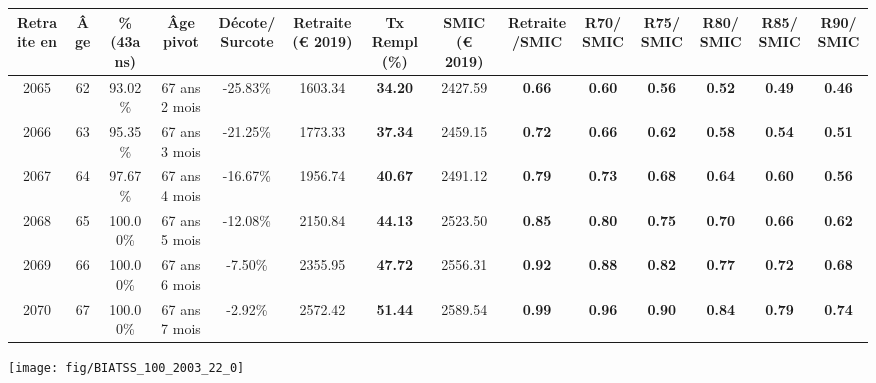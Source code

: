 \begin{adjustbox}{max width=\textwidth} 
\begin{tabular}[htb]{|c|c||c|c|c||c|c||c|c||c|c|c|c|c|} 
\hline 
 Retraite en &  Âge &  \%(43ans) &  Âge pivot &  Décote/Surcote &  Retraite (\euro{} 2019) &  Tx Rempl(\%) &  SMIC (\euro{} 2019) &  Retraite/SMIC &  R70/SMIC &  R75/SMIC &  R80/SMIC &  R85/SMIC &  R90/SMIC \\ 
\hline \hline 
 2065 &  62 &  93.02\% &  67 ans 2 mois &  -25.83\% &  1603.34 &  {\bf 34.20} &  2427.59 &  {\bf {\color{red} 0.66}} &  {\bf {\color{red} 0.60}} &  {\bf {\color{red} 0.56}} &  {\bf {\color{red} 0.52}} &  {\bf {\color{red} 0.49}} &  {\bf {\color{red} 0.46}} \\ 
\hline 
 2066 &  63 &  95.35\% &  67 ans 3 mois &  -21.25\% &  1773.33 &  {\bf 37.34} &  2459.15 &  {\bf {\color{red} 0.72}} &  {\bf {\color{red} 0.66}} &  {\bf {\color{red} 0.62}} &  {\bf {\color{red} 0.58}} &  {\bf {\color{red} 0.54}} &  {\bf {\color{red} 0.51}} \\ 
\hline 
 2067 &  64 &  97.67\% &  67 ans 4 mois &  -16.67\% &  1956.74 &  {\bf 40.67} &  2491.12 &  {\bf {\color{red} 0.79}} &  {\bf {\color{red} 0.73}} &  {\bf {\color{red} 0.68}} &  {\bf {\color{red} 0.64}} &  {\bf {\color{red} 0.60}} &  {\bf {\color{red} 0.56}} \\ 
\hline 
 2068 &  65 &  100.00\% &  67 ans 5 mois &  -12.08\% &  2150.84 &  {\bf 44.13} &  2523.50 &  {\bf {\color{red} 0.85}} &  {\bf {\color{red} 0.80}} &  {\bf {\color{red} 0.75}} &  {\bf {\color{red} 0.70}} &  {\bf {\color{red} 0.66}} &  {\bf {\color{red} 0.62}} \\ 
\hline 
 2069 &  66 &  100.00\% &  67 ans 6 mois &  -7.50\% &  2355.95 &  {\bf 47.72} &  2556.31 &  {\bf {\color{red} 0.92}} &  {\bf {\color{red} 0.88}} &  {\bf {\color{red} 0.82}} &  {\bf {\color{red} 0.77}} &  {\bf {\color{red} 0.72}} &  {\bf {\color{red} 0.68}} \\ 
\hline 
 2070 &  67 &  100.00\% &  67 ans 7 mois &  -2.92\% &  2572.42 &  {\bf 51.44} &  2589.54 &  {\bf {\color{red} 0.99}} &  {\bf {\color{red} 0.96}} &  {\bf {\color{red} 0.90}} &  {\bf {\color{red} 0.84}} &  {\bf {\color{red} 0.79}} &  {\bf {\color{red} 0.74}} \\ 
\hline 
\hline 
\end{tabular} 
\end{adjustbox} 
 
 \vspace{0.1cm} 

 {\hspace{-2.2cm}\texttt{[image: fig/BIATSS\_100\_2003\_22\_0]}} 

